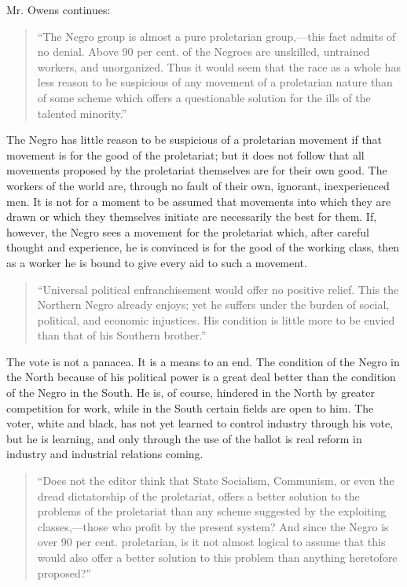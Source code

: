\documentclass[letterpaper,10pt,english]{jupyterBook}
\begin{document}
\sphinxAtStartPar
Mr. Owens continues:
\begin{quote}

\sphinxAtStartPar
“The Negro group is almost a pure proletarian group,—this fact admits of no denial. Above 90 per cent. of the Negroes are unskilled, untrained workers, and unorganized. Thus it would seem that the race as a whole has less reason to be suspicious of any movement of a proletarian nature than of some scheme which offers a questionable solution for the ills of the talented minority.”
\end{quote}

\sphinxAtStartPar
The Negro has little reason to be suspicious of a proletarian movement if that movement is for the good of the proletariat; but it does not follow that all movements proposed by the proletariat themselves are for their own good. The workers of the world are, through no fault of their own, ignorant, inexperienced men. It is not for a moment to be assumed that movements into which they are drawn or which they themselves initiate are necessarily the best for them. If, however, the Negro sees a movement for the proletariat which, after careful thought and experience, he is convinced is for the good of the working class, then as a worker he is bound to give every aid to such a movement.
\begin{quote}

\sphinxAtStartPar
“Universal political enfranchisement would offer no positive relief. This the Northern Negro already enjoys; yet he suffers under the burden of social, political, and economic injustices. His condition is little more to be envied than that of his Southern brother.”
\end{quote}

\sphinxAtStartPar
The vote is not a panacea. It is a means to an end. The condition of the Negro in the North because of his political power is a great deal better than the condition of the Negro in the South. He is, of course, hindered in the North by greater competition for work, while in the South certain fields are open to him. The voter, white and black, has not yet learned to control industry through his vote, but he is learning, and only through the use of the ballot is real reform in industry and industrial relations coming.
\begin{quote}

\sphinxAtStartPar
“Does not the editor think that State Socialism, Communism, or even the dread dictatorship of the proletariat, offers a better solution to the problems of the proletariat than any scheme suggested by the exploiting classes,—those who profit by the present system? And since the Negro is over 90 per cent. proletarian, is it not almost logical to assume that this would also offer a better solution to this problem than anything heretofore proposed?”
\end{quote}
\end{document}
